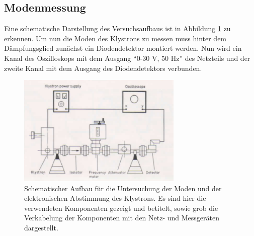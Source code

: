         \subsection{Modenmessung}
        Eine schematische Darstellung des Versuchsaufbaus ist in Abbildung \ref{fig:3} zu erkennen.
        Um nun die Moden des Klystrons zu messen muss hinter dem Dämpfungsglied zunächst ein Diodendetektor montiert werden.
        Nun wird ein Kanal des Oszilloskops mit dem Ausgang \enquote{0-30 V, 50 Hz} des Netzteils und der zweite Kanal mit dem Ausgang des Diodendetektors verbunden.
        \begin{figure}[H]
            \centering
            \includegraphics[width=0.7\textwidth]{pics/v53_1.png}
            \caption{Schematischer Aufbau für die Untersuchung der Moden und der elektronischen Abstimmung des Klystrons. Es sind hier die verwendeten Komponenten gezeigt und betitelt, sowie grob die Verkabelung der Komponenten mit den Netz- und Messgeräten dargestellt.\cite{Mikro}}
            \label{fig:3}
        \end{figure}

